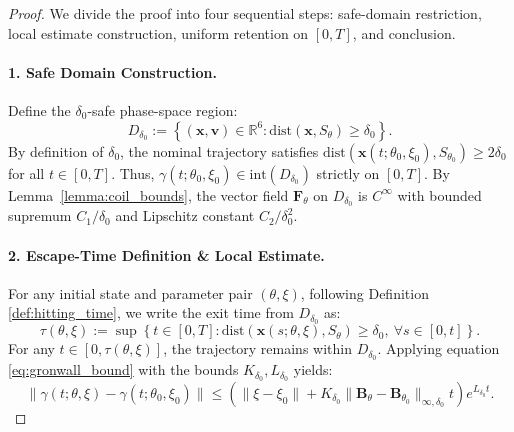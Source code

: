 \documentclass{article}
\begin{document}
\begin{proof}
	We divide the proof into four sequential steps: safe-domain restriction, local estimate construction, uniform retention on $[0,T]$, and conclusion.
	
	\paragraph{1. Safe Domain Construction.}
	Define the $\delta_0$-safe phase-space region:
	\begin{equation}
		D_{\delta_0} := \left\{ (\mathbf{x},\mathbf{v}) \in \mathbb{R}^6 : \mathrm{dist}(\mathbf{x}, S_\theta) \ge \delta_0 \right\} .
	\end{equation}
	By definition of $\delta_0$, the nominal trajectory satisfies $\mathrm{dist}(\mathbf{x}(t;\theta_0,\xi_0), S_{\theta_0}) \ge 2\delta_0$ for all $t \in [0,T]$. Thus, $\gamma(t;\theta_0,\xi_0) \in \mathrm{int}(D_{\delta_0})$ strictly on $[0,T]$.
	By Lemma~\ref{lemma:coil_bounds}, the vector field $\mathbf{F}_\theta$ on $D_{\delta_0}$ is $C^\infty$ with bounded supremum $C_1/\delta_0$ and Lipschitz constant $C_2/\delta_0^2$.
	
	\paragraph{2. Escape-Time Definition \& Local Estimate.}
	For any initial state and parameter pair $(\theta,\xi)$, following Definition \ref{def:hitting_time}, we write the exit time from $D_{\delta_0}$ as:
	\begin{equation}
		\tau(\theta,\xi) := \sup \left\{ t \in [0,T] : \mathrm{dist}(\mathbf{x}(s;\theta,\xi), S_\theta) \ge \delta_0 , \ \forall s \in [0,t] \right\} .
	\end{equation}
	For any $t \in [0, \tau(\theta,\xi)]$, the trajectory remains within $D_{\delta_0}$. Applying equation \eqref{eq:gronwall_bound} with the bounds $K_{\delta_0}, L_{\delta_0}$ yields:
	\begin{equation} \label{eq:local_gronwall}
		\|\gamma(t;\theta,\xi) - \gamma(t;\theta_0,\xi_0)\| \le \left( \|\xi - \xi_0\| + K_{\delta_0} \|\mathbf{B}_\theta - \mathbf{B}_{\theta_0}\|_{\infty,\delta_0} t \right) e^{L_{\delta_0} t} .
	\end{equation}
	

\end{proof}
\end{document}

